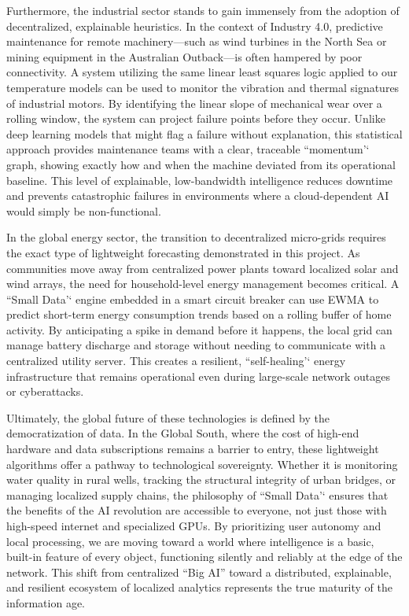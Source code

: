 \documentclass[14pt]{extarticle}
\begin{document}
Furthermore, the industrial sector stands to gain immensely from the adoption
of decentralized, explainable heuristics. In the context of Industry 4.0,
predictive maintenance for remote machinery---such as wind turbines in the North
Sea or mining equipment in the Australian Outback---is often hampered by poor
connectivity. A system utilizing the same linear least squares logic applied to
our temperature models can be used to monitor the vibration and thermal
signatures of industrial motors. By identifying the linear slope of mechanical
wear over a rolling window, the system can project failure points before they
occur. Unlike deep learning models that might flag a failure without explanation,
this statistical approach provides maintenance teams with a clear, traceable
``momentum'` graph, showing exactly how and when the machine deviated from its
operational baseline. This level of explainable, low-bandwidth intelligence
reduces downtime and prevents catastrophic failures in environments where a
cloud-dependent AI would simply be non-functional.

In the global energy sector, the transition to decentralized micro-grids
requires the exact type of lightweight forecasting demonstrated in this project.
As communities move away from centralized power plants toward localized solar
and wind arrays, the need for household-level energy management becomes critical.
A ``Small Data'` engine embedded in a smart circuit breaker can use EWMA to
predict short-term energy consumption trends based on a rolling buffer of home
activity. By anticipating a spike in demand before it happens, the local grid
can manage battery discharge and storage without needing to communicate with a
centralized utility server. This creates a resilient, ``self-healing'` energy
infrastructure that remains operational even during large-scale network outages
or cyberattacks.

Ultimately, the global future of these technologies is defined by the
democratization of data. In the Global South, where the cost of high-end
hardware and data subscriptions remains a barrier to entry, these lightweight
algorithms offer a pathway to technological sovereignty. Whether it is
monitoring water quality in rural wells, tracking the structural integrity of
urban bridges, or managing localized supply chains, the philosophy of ``Small
Data'` ensures that the benefits of the AI revolution are accessible to everyone,
not just those with high-speed internet and specialized GPUs. By prioritizing
user autonomy and local processing, we are moving toward a world where
intelligence is a basic, built-in feature of every object, functioning silently
and reliably at the edge of the network. This shift from centralized ``Big AI''
toward a distributed, explainable, and resilient ecosystem of localized
analytics represents the true maturity of the information age.
\end{document}
